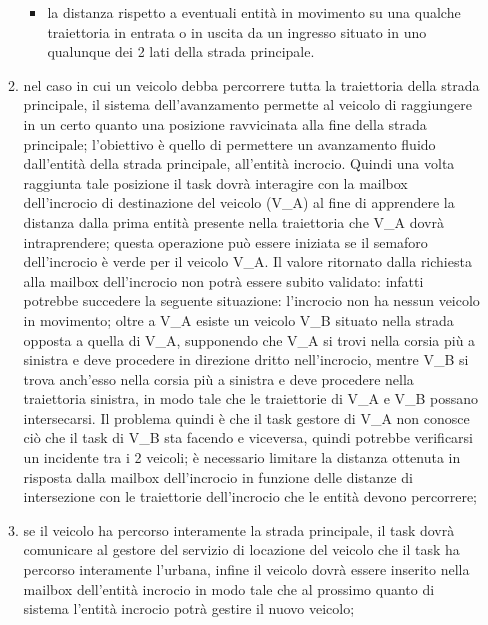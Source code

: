 \begin{enumerate}
\begin{enumerate}
\begin{itemize}
\item la distanza rispetto a eventuali entità in movimento su una qualche traiettoria in entrata o in uscita da un ingresso situato in uno qualunque dei 2 lati della strada principale. 
\end{itemize}
\item nel caso in cui un veicolo debba percorrere tutta la traiettoria della strada principale, il sistema dell'avanzamento permette al veicolo di raggiungere in un certo quanto una posizione ravvicinata alla fine della strada principale; l'obiettivo è quello di permettere un avanzamento fluido dall'entità della strada principale, all'entità incrocio. Quindi una volta raggiunta tale posizione il task dovrà interagire con la mailbox dell'incrocio di destinazione del veicolo (V\_A) al fine di apprendere la distanza dalla prima entità presente nella traiettoria che V\_A dovrà intraprendere; questa operazione può essere iniziata se il semaforo dell'incrocio è verde per il veicolo V\_A. Il valore ritornato dalla richiesta alla mailbox dell'incrocio non potrà essere subito validato: infatti potrebbe succedere la seguente situazione: l'incrocio non ha nessun veicolo in movimento; oltre a V\_A esiste un veicolo V\_B situato nella strada opposta a quella di V\_A, supponendo che V\_A si trovi nella corsia più a sinistra e deve procedere in direzione dritto nell'incrocio, mentre V\_B si trova anch'esso nella corsia più a sinistra e deve procedere nella traiettoria sinistra, in modo tale che le traiettorie di V\_A e V\_B possano intersecarsi. Il problema quindi è che il task gestore di V\_A non conosce ciò che il task di V\_B sta facendo e viceversa, quindi potrebbe verificarsi un incidente tra i 2 veicoli; è necessario limitare la distanza ottenuta in risposta dalla mailbox dell'incrocio in funzione delle distanze di intersezione con le traiettorie dell'incrocio che le entità devono percorrere;
\item se il veicolo ha percorso interamente la strada principale, il task dovrà comunicare al gestore del servizio di locazione del veicolo che il task ha percorso interamente l'urbana, infine il veicolo dovrà essere inserito nella mailbox dell'entità incrocio in modo tale che al prossimo quanto di sistema l'entità incrocio potrà gestire il nuovo veicolo;

\end{enumerate}
\end{enumerate}

